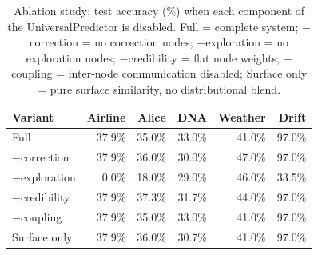 \begin{table}[h]
\centering
\caption{Ablation study: test accuracy (\%) when each component of the UniversalPredictor is disabled. Full = complete system; $-$correction = no correction nodes; $-$exploration = no exploration nodes; $-$credibility = flat node weights; $-$coupling = inter-node communication disabled; Surface only = pure surface similarity, no distributional blend.}
\label{tab:ablation}
\begin{tabular}{lrrrrr}
\toprule
Variant & Airline & Alice & DNA & Weather & Drift \\
\midrule
Full & 37.9\% & 35.0\% & 33.0\% & 41.0\% & 97.0\% \\
$-$correction & 37.9\% & 36.0\% & 30.0\% & 47.0\% & 97.0\% \\
$-$exploration & 0.0\% & 18.0\% & 29.0\% & 46.0\% & 33.5\% \\
$-$credibility & 37.9\% & 37.3\% & 31.7\% & 44.0\% & 97.0\% \\
$-$coupling & 37.9\% & 35.0\% & 33.0\% & 41.0\% & 97.0\% \\
Surface only & 37.9\% & 36.0\% & 30.7\% & 41.0\% & 97.0\% \\
\bottomrule
\end{tabular}
\end{table}
